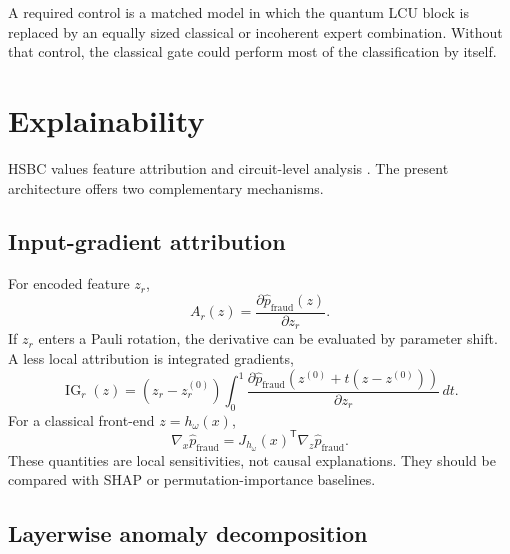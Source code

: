 \documentclass[11pt,a4paper]{article}
\newcommand{\pfraud}{p_{\mathrm{fraud}}}
\newcommand{\T}{\mathsf{T}}
\begin{document}
A required control is a matched model in which the quantum LCU block is replaced by an equally sized classical or incoherent expert combination. Without that control, the classical gate could perform most of the classification by itself.

\section{Explainability}

HSBC values feature attribution and circuit-level analysis \cite{HSBC2026}. The present architecture offers two complementary mechanisms.

\subsection{Input-gradient attribution}

For encoded feature $z_r$,
\begin{equation}
    A_r(z)
    =\frac{\partial\widehat\pfraud(z)}{\partial z_r}.
\end{equation}
If $z_r$ enters a Pauli rotation, the derivative can be evaluated by parameter shift. A less local attribution is integrated gradients,
\begin{equation}
\operatorname{IG}_r(z)
=(z_r-z_r^{(0)})
\int_0^1
\frac{\partial
\widehat\pfraud\!\left(z^{(0)}+t(z-z^{(0)})\right)}
{\partial z_r}\,dt.
\end{equation}
For a classical front-end $z=h_\omega(x)$,
\begin{equation}
    \nabla_x\widehat\pfraud
    =J_{h_\omega}(x)^{\T}\nabla_z\widehat\pfraud.
\end{equation}
These quantities are local sensitivities, not causal explanations. They should be compared with SHAP or permutation-importance baselines.

\subsection{Layerwise anomaly decomposition}
\end{document}
